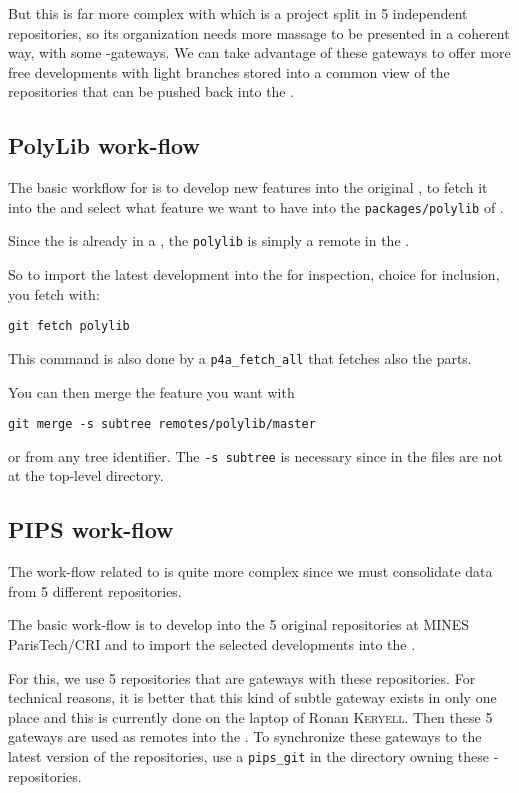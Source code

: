 \documentclass[a4paper]{article}
\begin{document}
But this is far more complex with \Apips which is a project split in 5
independent \Asvn repositories, so its organization needs more massage to
be presented in a coherent way, with some \Asvn-\Agit gateways. We can
take advantage of these gateways to offer more free developments with
light branches stored into a common \Agit view of the \Apips{} \Asvn
repositories that can be pushed back into the \Apips{} \Asvn .


\subsection{PolyLib work-flow}
\label{sec:polylib-workflow}

The basic workflow for \Apolylib is to develop new features into the
original \Apolylib{} \Agit, to fetch it into the \Apfa{} \Agit and select what
feature we want to have into the \texttt{packages/polylib} of \Apfa.

Since the \Apolylib is already in a \Agit, the \texttt{polylib} is simply
a remote in the \Apfa{} \Agit.

So to import the latest \Apolylib development into the \Apfa{} \Agit for
inspection, choice for inclusion, you fetch \Apolylib with:
\begin{verbatim}
git fetch polylib
\end{verbatim}
This command is also done by a \verb|p4a_fetch_all| that fetches also the
\Apips parts.

You can then merge the feature you want with
\begin{verbatim}
git merge -s subtree remotes/polylib/master
\end{verbatim}
or from any tree
identifier. The \texttt{-s subtree} is necessary since in \Apfa the
\Apolylib files are not at the top-level directory.


\subsection{PIPS work-flow}
\label{sec:pips-workflow}

The work-flow related to \Apips is quite more complex since we must
consolidate data from 5 different \Asvn repositories.

The basic \Apips work-flow is to develop into the 5 original \Apips{}
\Asvn repositories at MINES ParisTech/CRI and to import the selected
developments into the \Apfa{} \Agit.

For this, we use 5 \Agit repositories that are gateways with these \Asvn
repositories. For technical reasons, it is better that this kind of subtle
gateway exists in only one place and this is currently done on the laptop
of Ronan \textsc{Keryell}. Then these 5 gateways are used as remotes into
the \Apfa{} \Agit. To synchronize these gateways to the latest version of
the \Apips{} \Asvn repositories, use a \verb|pips_git| in the directory
owning these \Agit-\Asvn repositories.
\end{document}
